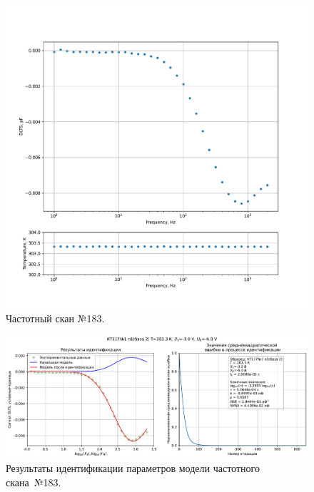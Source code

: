 \begin{figure}[!ht]
    \centering
    \includegraphics[width=1\textwidth]{../plots/КТ117№1_п1(база 2)_2500Гц-1Гц_1пФ_+30С_-3В-6В_100мВ_20мкс_шаг_0,1.pdf}
    \caption{Частотный скан №183.}
    \label{pic:frequency_scan_183}
\end{figure}

\begin{figure}[!ht]
    \centering
    \includegraphics[width=1\textwidth]{../plots/КТ117№1_п1(база 2)_2500Гц-1Гц_1пФ_+30С_-3В-6В_100мВ_20мкс_шаг_0,1_model.pdf}
    \caption{Результаты идентификации параметров модели частотного скана~№183.}
    \label{pic:frequency_scan_model183}
\end{figure}

\pagebreak


